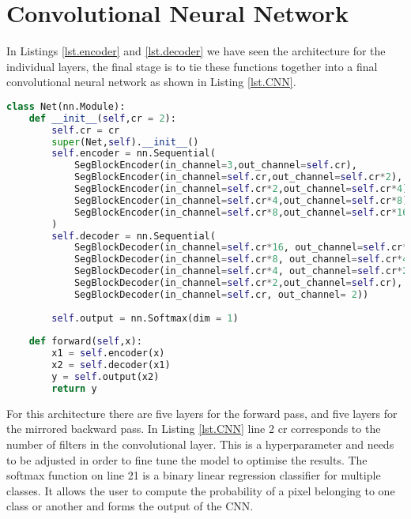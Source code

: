 \section{Convolutional Neural Network}\label{sub.CNN}
In Listings \ref{lst.encoder} and \ref{lst.decoder} we have seen the architecture for the individual layers, the final stage is to tie these functions together into a final convolutional neural network as shown in Listing \ref{lst.CNN}.
\begin{lstlisting}[language=Python, caption = {A Fully connected Convolutional Neural Network. Shows how the encoder and decoder classes are arranged sequentially in order to transform the data and make a prediction on the pixel class.}, label={lst.CNN},float,floatplacement=htbp]
class Net(nn.Module):
    def __init__(self,cr = 2):
        self.cr = cr
        super(Net,self).__init__()
        self.encoder = nn.Sequential(
            SegBlockEncoder(in_channel=3,out_channel=self.cr),
            SegBlockEncoder(in_channel=self.cr,out_channel=self.cr*2),
            SegBlockEncoder(in_channel=self.cr*2,out_channel=self.cr*4),
            SegBlockEncoder(in_channel=self.cr*4,out_channel=self.cr*8),
            SegBlockEncoder(in_channel=self.cr*8,out_channel=self.cr*16)
        )
        self.decoder = nn.Sequential(
            SegBlockDecoder(in_channel=self.cr*16, out_channel=self.cr*8),
            SegBlockDecoder(in_channel=self.cr*8, out_channel=self.cr*4),
            SegBlockDecoder(in_channel=self.cr*4, out_channel=self.cr*2),
            SegBlockDecoder(in_channel=self.cr*2,out_channel=self.cr),
            SegBlockDecoder(in_channel=self.cr, out_channel= 2))
        
        self.output = nn.Softmax(dim = 1)
        
    def forward(self,x):
        x1 = self.encoder(x)
        x2 = self.decoder(x1)
        y = self.output(x2)
        return y
\end{lstlisting}
For this architecture there are five layers for the forward pass, and five layers for the mirrored backward pass. In Listing \ref{lst.CNN} line 2 cr corresponds to the number of filters in the convolutional layer. This is a hyperparameter and needs to be adjusted in order to fine tune the model to optimise the results. The softmax function on line 21 is a binary linear regression classifier for multiple classes. It allows the user to compute the probability of a pixel belonging to one class or another and forms the output of the CNN.
